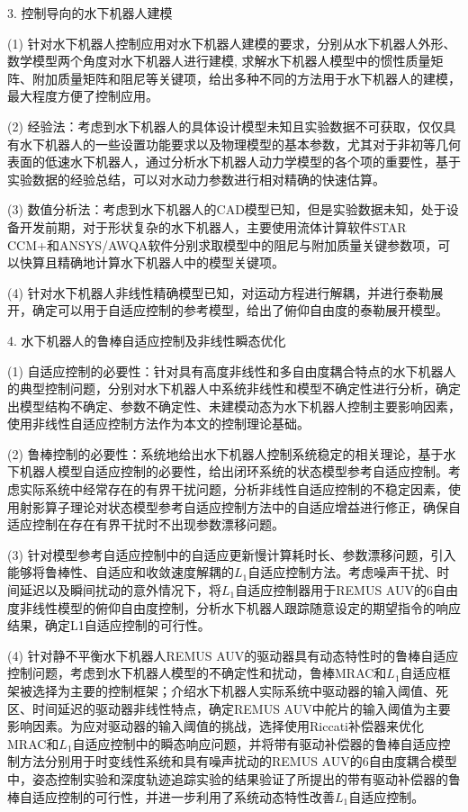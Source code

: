 3. 控制导向的水下机器人建模

(1) 针对水下机器人控制应用对水下机器人建模的要求，分别从水下机器人外形、数学模型两个角度对水下机器人进行建模, 求解水下机器人模型中的惯性质量矩阵、附加质量矩阵和阻尼等关键项，给出多种不同的方法用于水下机器人的建模，最大程度方便了控制应用。

(2) 经验法：考虑到水下机器人的具体设计模型未知且实验数据不可获取，仅仅具有水下机器人的一些设置功能要求以及物理模型的基本参数，尤其对于非初等几何表面的低速水下机器人，通过分析水下机器人动力学模型的各个项的重要性，基于实验数据的经验总结，可以对水动力参数进行相对精确的快速估算。

(3) 数值分析法：考虑到水下机器人的CAD模型已知，但是实验数据未知，处于设备开发前期，对于形状复杂的水下机器人，主要使用流体计算软件STAR CCM+和ANSYS/AWQA软件分别求取模型中的阻尼与附加质量关键参数项，可以快算且精确地计算水下机器人中的模型关键项。

(4) 针对水下机器人非线性精确模型已知，对运动方程进行解耦，并进行泰勒展开，确定可以用于自适应控制的参考模型，给出了俯仰自由度的泰勒展开模型。

4. 水下机器人的鲁棒自适应控制及非线性瞬态优化

(1) 自适应控制的必要性：针对具有高度非线性和多自由度耦合特点的水下机器人的典型控制问题，分别对水下机器人中系统非线性和模型不确定性进行分析，确定出模型结构不确定、参数不确定性、未建模动态为水下机器人控制主要影响因素，使用非线性自适应控制方法作为本文的控制理论基础。

(2) 鲁棒控制的必要性：系统地给出水下机器人控制系统稳定的相关理论，基于水下机器人模型自适应控制的必要性，给出闭环系统的状态模型参考自适应控制。考虑实际系统中经常存在的有界干扰问题，分析非线性自适应控制的不稳定因素，使用射影算子理论对状态模型参考自适应控制方法中的自适应增益进行修正，确保自适应控制在存在有界干扰时不出现参数漂移问题。

(3) 针对模型参考自适应控制中的自适应更新慢计算耗时长、参数漂移问题，引入能够将鲁棒性、自适应和收敛速度解耦的$L_1$自适应控制方法。考虑噪声干扰、时间延迟以及瞬间扰动的意外情况下，将$L_1$自适应控制器用于REMUS AUV的6自由度非线性模型的俯仰自由度控制，分析水下机器人跟踪随意设定的期望指令的响应结果，确定L1自适应控制的可行性。

(4) 针对静不平衡水下机器人REMUS AUV的驱动器具有动态特性时的鲁棒自适应控制问题，考虑到水下机器人模型的不确定性和扰动，鲁棒MRAC和$L_1$自适应框架被选择为主要的控制框架；介绍水下机器人实际系统中驱动器的输入阈值、死区、时间延迟的驱动器非线性特点，确定REMUS AUV中舵片的输入阈值为主要影响因素。为应对驱动器的输入阈值的挑战，选择使用Riccati补偿器来优化MRAC和$L_1$自适应控制中的瞬态响应问题，并将带有驱动补偿器的鲁棒自适应控制方法分别用于时变线性系统和具有噪声扰动的REMUS AUV的6自由度耦合模型中，姿态控制实验和深度轨迹追踪实验的结果验证了所提出的带有驱动补偿器的鲁棒自适应控制的可行性，并进一步利用了系统动态特性改善$L_1$自适应控制。


